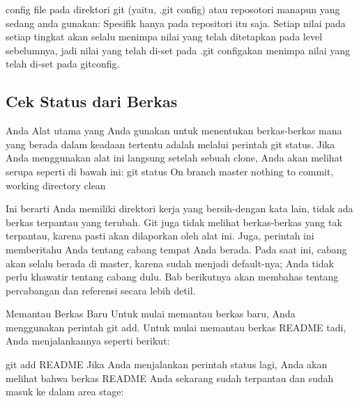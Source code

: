 {{{\vspace{\baselineskip}
\noindent 
{\fontsize{14pt}{14pt}\selectfont config file pada direktori git (yaitu, $  $.git config) atau reposotori manapun yang sedang anda gunakan: Spesifik hanya pada repositori itu saja. Setiap nilai pada setiap tingkat akan selalu menimpa nilai yang telah ditetapkan pada level sebelumnya, jadi nilai yang telah di-set pada $  $.git configakan menimpa nilai yang telah di-set pada $  $gitconfig. \\} \par

\noindent
{\fontsize{14pt}{14pt}\subsection {Cek Status dari Berkas} 
	
	\vspace{14pt}
	\noindent
	{\fontsize{14pt}{14pt}\selectfont Anda
	Alat utama yang Anda gunakan untuk menentukan berkas-berkas mana yang berada dalam keadaan tertentu adalah melalui perintah git status. Jika Anda menggunakan alat ini langsung setelah sebuah clone, Anda akan melihat serupa seperti di bawah ini:
	git status
	On branch master
	nothing to commit, working directory clean
	
	\vspace{14pt}
	\noindent
	{\fontsize{14pt}{14pt}\selectfont 
	Ini berarti Anda memiliki direktori kerja yang bersih-dengan kata lain, tidak ada berkas terpantau yang terubah. Git juga tidak melihat berkas-berkas yang tak terpantau, karena pasti akan dilaporkan oleh alat ini. Juga, perintah ini memberitahu Anda tentang cabang tempat Anda berada. Pada saat ini, cabang akan selalu berada di master, karena sudah menjadi default-nya; Anda tidak perlu khawatir tentang cabang dulu. Bab berikutnya akan membahas tentang percabangan dan referensi secara lebih detil.
	
	\vspace{14pt}
	\noindent
	{\fontsize{14pt}{14pt}\selectfont
	Memantau Berkas Baru
	Untuk mulai memantau berkas baru, Anda menggunakan perintah git add. Untuk mulai memantau berkas README tadi, Anda menjalankannya seperti berikut:
	
	\vspace{14pt}
	\noindent
	{\fontsize{14pt}{14pt}\selectfont
	git add README
	Jika Anda menjalankan perintah status lagi, Anda akan melihat bahwa berkas README Anda sekarang sudah terpantau dan sudah masuk ke dalam area stage:
	\begin{verbatim}
		

\end{verbatim}}}}}}}}}
